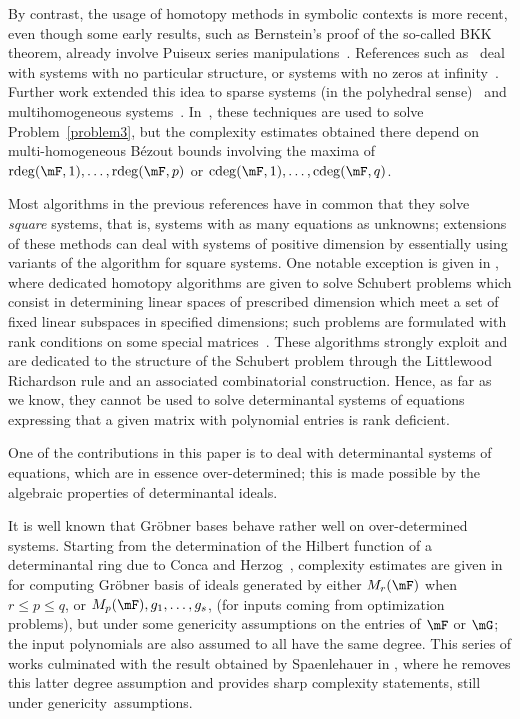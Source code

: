 \documentclass[12pt]{article}
\begin{document}
By contrast, the usage of homotopy methods in symbolic contexts is
more recent, even though some early results, such as Bernstein's proof
of the so-called BKK theorem, already involve Puiseux series
manipulations~\cite{Bernstein75}. References such
as~\cite{HeKrPuSaWa99,BoMaWaWa04} deal with systems with no particular
structure, or systems with no zeros at infinity~\cite{PaSa04}.
Further work extended this idea to sparse systems (in the polyhedral
sense)~\cite{JeMaSoWa09,HeJeSa10,HeJeSa13,HeJeSa14} and
multihomogeneous systems~\cite{HeJeSaSo02,SaSc16}.  In~\cite{SaSc16},
these techniques are used to solve Problem~\eqref{problem3}, but the
complexity estimates obtained there depend on multi-homogeneous
B\'ezout bounds involving the maxima of $\rdeg(\mF, 1), \ldots,
\rdeg(\mF, p)$ or $\cdeg(\mF,1), \ldots, \cdeg(\mF, q)$.

Most algorithms in the previous references have in common that they
solve {\em square} systems, that is, systems with as many equations as
unknowns; extensions of these methods can deal with systems of
positive dimension by essentially using variants of the algorithm for
square systems.  One notable exception is given in \cite{SVV10}, where
dedicated homotopy algorithms are given to solve Schubert problems
which consist in determining linear spaces of prescribed dimension
which meet a set of fixed linear subspaces in specified
dimensions; such problems are formulated with rank
conditions on some special matrices~\cite{LDSVV18}. These
algorithms strongly exploit and are dedicated to the structure of the
Schubert problem through the Littlewood Richardson rule and an
associated combinatorial construction. Hence, as far as we know, they
cannot be used to solve determinantal systems of equations expressing
that a given matrix with polynomial entries is rank deficient. 

One of the contributions in this paper is to deal with determinantal
systems of equations, which are in essence over-determined; this is
made possible by the algebraic properties of determinantal ideals.

It is well known that Gr\"obner bases behave rather well on
over-determined systems. Starting from the determination of the
Hilbert function of a determinantal ring due to Conca and
Herzog~\cite{CH94}, complexity estimates are given in
\cite{FSS13,FSS12} for computing Gr\"obner basis of ideals generated
by either $M_r(\mF)$ when $r\leq p\leq q$, or
$M_{p}(\mF),g_1,\dots,g_s$, (for inputs coming from optimization
problems), but under some genericity assumptions on the entries of
$\mF$ or $\mG$; the input polynomials are also assumed to all have the
same degree.  This series of works culminated with the result obtained
by Spaenlehauer in \cite{Spa14}, where he removes this latter degree
assumption and provides sharp complexity statements, still under
genericity~assumptions.
\end{document}
